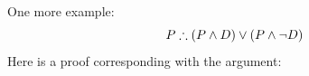 %






One more example:
$$P \therefore (P \eand D) \eor (P \eand \enot D)$$
Here is a proof corresponding with the argument:
\begin{fitchproof}
	\LEM
	\open
	\close
	\open
	\close
\end{fitchproof}


